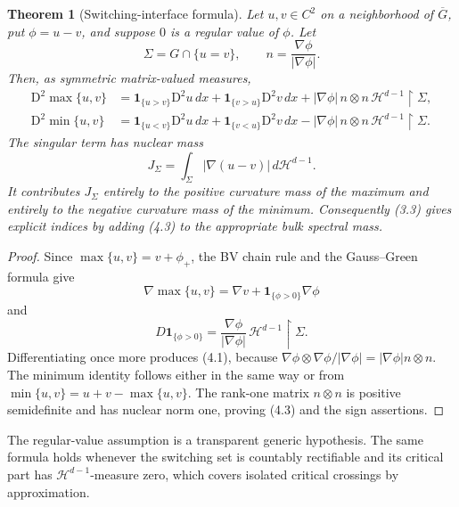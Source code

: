 \documentclass[11pt]{article}
\newtheorem{theorem}{Theorem}[section]
\newcommand{\Hess}{\mathrm D^2}
\begin{document}
\begin{theorem}[Switching-interface formula]
\label{thm:switch}
Let \(u,v\in C^2\) on a neighborhood of \(\overline G\), put
\(\phi=u-v\), and suppose \(0\) is a regular value of \(\phi\).  Let
\[
 \Sigma=G\cap\{u=v\},\qquad n=\frac{\nabla\phi}{{|\nabla\phi|}}.
\]
Then, as symmetric matrix-valued measures,
\begin{align}
 \Hess\max\{u,v\}
 &=\mathbf1_{\{u>v\}}\Hess u\,dx
   +\mathbf1_{\{v>u\}}\Hess v\,dx
   +|\nabla\phi|\,n\otimes n\,\mathcal H^{d-1}\!\restriction\Sigma,
                                                               \tag{4.1}\\
 \Hess\min\{u,v\}
 &=\mathbf1_{\{u<v\}}\Hess u\,dx
   +\mathbf1_{\{v<u\}}\Hess v\,dx
   -|\nabla\phi|\,n\otimes n\,\mathcal H^{d-1}\!\restriction\Sigma.
                                                               \tag{4.2}
\end{align}
The singular term has nuclear mass
\[
 J_\Sigma=\int_\Sigma|\nabla(u-v)|\,d\mathcal H^{d-1}.          \tag{4.3}
\]
It contributes \(J_\Sigma\) entirely to the positive curvature mass of the
maximum and entirely to the negative curvature mass of the minimum.
Consequently (3.3) gives explicit indices by adding (4.3) to the appropriate
bulk spectral mass.
\end{theorem}

\begin{proof}
Since \(\max\{u,v\}=v+\phi_+\), the BV chain rule and the Gauss--Green
formula give
\[
 \nabla\max\{u,v\}=\nabla v+\mathbf1_{\{\phi>0\}}\nabla\phi
\]
and
\[
 D\mathbf1_{\{\phi>0\}}
 =\frac{\nabla\phi}{|\nabla\phi|}\,
   \mathcal H^{d-1}\!\restriction\Sigma.
\]
Differentiating once more produces (4.1), because
\(\nabla\phi\otimes\nabla\phi/|\nabla\phi|
=|\nabla\phi|n\otimes n\).  The minimum identity follows either in the same
way or from \(\min\{u,v\}=u+v-\max\{u,v\}\).  The rank-one matrix
\(n\otimes n\) is positive semidefinite and has nuclear norm one, proving
(4.3) and the sign assertions.
\end{proof}

The regular-value assumption is a transparent generic hypothesis.  The same
formula holds whenever the switching set is countably rectifiable and its
critical part has \(\mathcal H^{d-1}\)-measure zero, which covers isolated
critical crossings by approximation.
\end{document}
